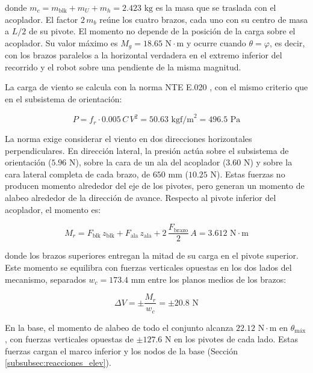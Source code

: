 \documentclass[../../General.tex]{subfiles}
\begin{document}
donde $m_c = m_{\text{blk}} + m_U + m_h = 2.423\text{ kg}$ es la masa que se traslada con el acoplador. El factor $2\,m_b$ reúne los cuatro brazos, cada uno con su centro de masa a $L/2$ de su pivote. El momento no depende de la posición de la carga sobre el acoplador. Su valor máximo es $M_g = 18.65\text{ N}\cdot\text{m}$ y ocurre cuando $\theta = \varphi$, es decir, con los brazos paralelos a la horizontal verdadera en el extremo inferior del recorrido y el robot sobre una pendiente de la misma magnitud.

La carga de viento se calcula con la norma NTE E.020 \citep{nte_e020}, con el mismo criterio que en el subsistema de orientación:

\begin{equation}\label{eq:viento_elev}
    P = f_r \cdot 0.005\, C\, V^2 = 50.63\text{ kgf/m}^2 = 496.5\text{ Pa}
\end{equation}

La norma exige considerar el viento en dos direcciones horizontales perpendiculares. En dirección lateral, la presión actúa sobre el subsistema de orientación ($5.96\text{ N}$), sobre la cara de un ala del acoplador ($3.60\text{ N}$) y sobre la cara lateral completa de cada brazo, de $650\text{ mm}$ ($10.25\text{ N}$). Estas fuerzas no producen momento alrededor del eje de los pivotes, pero generan un momento de alabeo alrededor de la dirección de avance. Respecto al pivote inferior del acoplador, el momento es:

\begin{equation}\label{eq:Mr_elev}
    M_r = F_{\text{blk}}\, z_{\text{blk}} + F_{\text{ala}}\, z_{\text{ala}} + 2\,\frac{F_{\text{brazo}}}{2}\, A = 3.612\text{ N}\cdot\text{m}
\end{equation}

donde los brazos superiores entregan la mitad de su carga en el pivote superior. Este momento se equilibra con fuerzas verticales opuestas en los dos lados del mecanismo, separados $w_c = 173.4\text{ mm}$ entre los planos medios de los brazos:

\begin{equation}\label{eq:dV_elev}
    \Delta V = \pm\frac{M_r}{w_c} = \pm 20.8\text{ N}
\end{equation}

En la base, el momento de alabeo de todo el conjunto alcanza $22.12\text{ N}\cdot\text{m}$ en $\theta_{\text{máx}}$, con fuerzas verticales opuestas de $\pm 127.6\text{ N}$ en los pivotes de cada lado. Estas fuerzas cargan el marco inferior y los nodos de la base (Sección \ref{subsubsec:reacciones_elev}).
\end{document}
